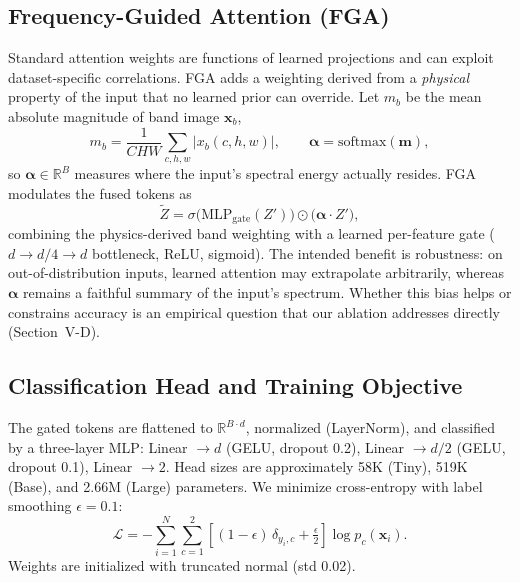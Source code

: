 \documentclass[journal]{IEEEtran}
\begin{document}
\subsection{Frequency-Guided Attention (FGA)}
\label{sec:fga}
Standard attention weights are functions of learned projections and can exploit dataset-specific correlations. FGA adds a weighting derived from a \emph{physical} property of the input that no learned prior can override. Let $m_b$ be the mean absolute magnitude of band image $\mathbf{x}_b$,
\begin{equation}
m_b = \frac{1}{CHW}\sum_{c,h,w} \left| x_b(c,h,w) \right|, \qquad \boldsymbol{\alpha} = \mathrm{softmax}(\mathbf{m}),
\end{equation}
so $\boldsymbol{\alpha} \in \mathbb{R}^{B}$ measures where the input's spectral energy actually resides. FGA modulates the fused tokens as
\begin{equation}
\tilde{Z} = \sigma\!\big(\mathrm{MLP}_{\mathrm{gate}}(Z')\big) \odot \big(\boldsymbol{\alpha} \cdot Z'\big),
\label{eq:fga}
\end{equation}
combining the physics-derived band weighting with a learned per-feature gate ($d \rightarrow d/4 \rightarrow d$ bottleneck, ReLU, sigmoid). The intended benefit is robustness: on out-of-distribution inputs, learned attention may extrapolate arbitrarily, whereas $\boldsymbol{\alpha}$ remains a faithful summary of the input's spectrum. Whether this bias helps or constrains accuracy is an empirical question that our ablation addresses directly (Section~V-D).

\subsection{Classification Head and Training Objective}
The gated tokens are flattened to $\mathbb{R}^{B \cdot d}$, normalized (LayerNorm), and classified by a three-layer MLP: Linear $\rightarrow d$ (GELU, dropout 0.2), Linear $\rightarrow d/2$ (GELU, dropout 0.1), Linear $\rightarrow 2$. Head sizes are approximately 58K (Tiny), 519K (Base), and 2.66M (Large) parameters. We minimize cross-entropy with label smoothing $\epsilon = 0.1$:
\begin{equation}
\mathcal{L} = -\sum_{i=1}^N \sum_{c=1}^2 \left[(1-\epsilon)\,\delta_{y_i,c} + \tfrac{\epsilon}{2}\right] \log p_c(\mathbf{x}_i).
\label{eq:loss}
\end{equation}
Weights are initialized with truncated normal (std 0.02).
\end{document}
